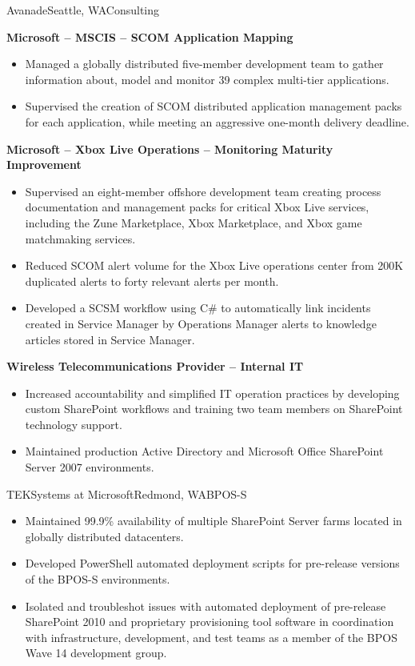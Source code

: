 \documentclass[11pt,letter,roman]{moderncv}
\begin{document}
{Avanade}{Seattle, WA}{Consulting}{%
  \textbf{Microsoft -- MSCIS -- SCOM Application Mapping}
  \begin{itemize}
    \item Managed a globally distributed five-member development team to gather
      information about, model and monitor 39 complex multi-tier applications.
    \item Supervised the creation of SCOM distributed application management
      packs for each application, while meeting an aggressive one-month
      delivery deadline.
  \end{itemize}
  \textbf{Microsoft -- Xbox Live Operations -- Monitoring Maturity Improvement}
  \begin{itemize}
   \item Supervised an eight-member offshore development team creating
      process documentation and management packs for critical Xbox Live
      services, including the Zune Marketplace, Xbox Marketplace, and Xbox
      game matchmaking services.
    \item Reduced SCOM alert volume for the Xbox Live operations center from
      200K duplicated alerts to forty relevant alerts per month.
    \item Developed a SCSM workflow using C\# to automatically link incidents
      created in Service Manager by Operations Manager alerts to knowledge
      articles stored in Service Manager.
  \end{itemize}
  \textbf{Wireless Telecommunications Provider -- Internal IT}
  \begin{itemize}
    \item Increased accountability and simplified IT operation practices by
      developing custom SharePoint workflows and training two team members on
      SharePoint technology support.
    \item Maintained production Active Directory and Microsoft Office
      SharePoint Server 2007 environments.
  \end{itemize}
}
{TEKSystems at Microsoft}{Redmond, WA}{BPOS-S}{%
  \begin{itemize}
    \item Maintained 99.9\% availability of multiple SharePoint Server farms
      located in globally distributed datacenters.
    \item Developed PowerShell automated deployment scripts for pre-release
      versions of the BPOS-S environments.
    \item Isolated and troubleshot issues with automated deployment of
      pre-release SharePoint 2010 and proprietary provisioning tool software in
      coordination with infrastructure, development, and test teams as a member
      of the BPOS Wave 14 development group.
  \end{itemize}
}
\end{document}
